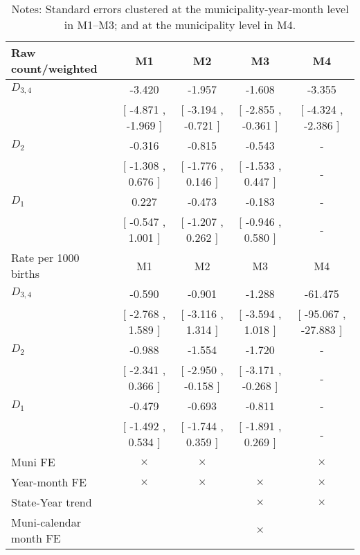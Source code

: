 \begin{table}[!ht]
\centering
\caption{Effects of Drought on preterml37}\label{tab:twfe_preterml37}
\fontsize{10pt}{12pt}\selectfont
\begin{tabular}{lcccc}
\toprule
  Raw count/weighted &\multicolumn{1}{c}{M1}&\multicolumn{1}{c}{M2}&\multicolumn{1}{c}{M3}&\multicolumn{1}{c}{M4} \\
\midrule
 $ D_{3,4} $ &    -3.420 &    -1.957 &    -1.608 &    -3.355 \\ 
 & [    -4.871 ,    -1.969 ] & [    -3.194 ,    -0.721 ] & [    -2.855 ,    -0.361 ] & [    -4.324 ,    -2.386 ] \\ 
\addlinespace
 $ D_2 $ &    -0.316 &    -0.815 &    -0.543 & - \\ 
 & [    -1.308 ,     0.676 ] & [    -1.776 ,     0.146 ] & [    -1.533 ,     0.447 ] & - \\ 
\addlinespace
 $ D_1 $ &     0.227 &    -0.473 &    -0.183 & - \\ 
 & [    -0.547 ,     1.001 ] & [    -1.207 ,     0.262 ] & [    -0.946 ,     0.580 ] & - \\ 
\addlinespace
\midrule
  Rate per 1000 births &\multicolumn{1}{c}{M1}&\multicolumn{1}{c}{M2}&\multicolumn{1}{c}{M3}&\multicolumn{1}{c}{M4} \\
\midrule
 $ D_{3,4} $ &    -0.590 &    -0.901 &    -1.288 &   -61.475 \\ 
 & [    -2.768 ,     1.589 ] & [    -3.116 ,     1.314 ] & [    -3.594 ,     1.018 ] & [   -95.067 ,   -27.883 ] \\ 
\addlinespace
 $ D_2 $ &    -0.988 &    -1.554 &    -1.720 & - \\ 
 & [    -2.341 ,     0.366 ] & [    -2.950 ,    -0.158 ] & [    -3.171 ,    -0.268 ] & - \\ 
\addlinespace
 $ D_1 $ &    -0.479 &    -0.693 &    -0.811 & - \\ 
 & [    -1.492 ,     0.534 ] & [    -1.744 ,     0.359 ] & [    -1.891 ,     0.269 ] & - \\ 
\midrule
  Muni FE & $ \times $ & $ \times $ &  & $ \times $  \\
  Year-month FE & $ \times $ & $ \times $ & $ \times $ & $ \times $ \\
  State-Year trend &  &  & $ \times $ & $ \times $ \\
  Muni-calendar month FE &  &  & $ \times $ & \\
\bottomrule
\end{tabular}
\caption*{\footnotesize{Notes: Standard errors clustered at the municipality-year-month level in M1--M3; and at the municipality level in M4.}}
\end{table}

